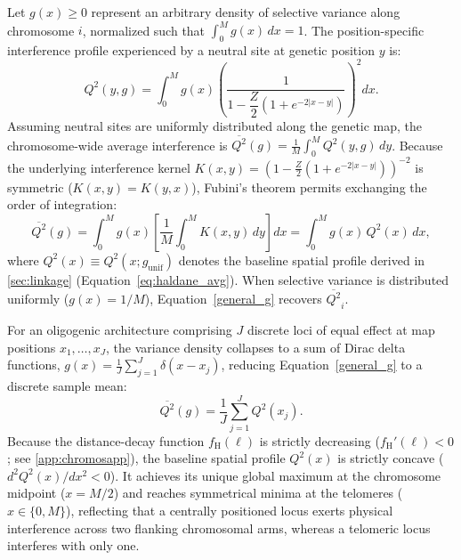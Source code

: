 \documentclass[12pt]{article}
\begin{document}
Let $g(x) \ge 0$ represent an arbitrary density of selective variance along chromosome $i$, normalized such that $\int_0^M g(x)\,dx = 1$. The position-specific interference profile experienced by a neutral site at genetic position $y$ is:
\begin{equation}
    Q^2(y, g) = \int_0^M g(x)\left(\frac{1}{1 - \dfrac{Z}{2}\left(1 + e^{-2|x-y|}\right)}\right)^2 dx.
\end{equation}
Assuming neutral sites are uniformly distributed along the genetic map, the chromosome-wide average interference is $\overline{Q^2}(g) = \frac{1}{M}\int_0^M Q^2(y, g)\,dy$. Because the underlying interference kernel $K(x,y) = \left(1 - \frac{Z}{2}(1 + e^{-2|x-y|})\right)^{-2}$ is symmetric ($K(x,y) = K(y,x)$), Fubini's theorem permits exchanging the order of integration:
\begin{equation}
    \overline{Q^2}(g) = \int_0^M g(x) \left[\frac{1}{M}\int_0^M K(x,y)\,dy\right] dx = \int_0^M g(x)\,Q^2(x)\,dx, \label{general_g}
\end{equation}
where $Q^2(x) \equiv Q^2(x; g_\text{unif})$ denotes the baseline spatial profile derived in \autoref{sec:linkage} (Equation~\eqref{eq:haldane_avg}). When selective variance is distributed uniformly ($g(x) = 1/M$), Equation~\eqref{general_g} recovers $\overline{Q^2}_i$. 

For an oligogenic architecture comprising $J$ discrete loci of equal effect at map positions $x_1, \ldots, x_J$, the variance density collapses to a sum of Dirac delta functions, $g(x) = \frac{1}{J}\sum_{j=1}^J \delta(x - x_j)$, reducing Equation~\eqref{general_g} to a discrete sample mean:
\begin{equation}
    \overline{Q^2}(g) = \frac{1}{J}\sum_{j=1}^J Q^2(x_j). \label{oligogenic_mean}
\end{equation}
Because the distance-decay function $f_\text{H}(\ell)$ is strictly decreasing ($f_\text{H}'(\ell) < 0$; see \autoref{app:chromosapp}), the baseline spatial profile $Q^2(x)$ is strictly concave ($d^2 Q^2(x)/dx^2 < 0$). It achieves its unique global maximum at the chromosome midpoint ($x = M/2$) and reaches symmetrical minima at the telomeres ($x \in \{0, M\}$), reflecting that a centrally positioned locus exerts physical interference across two flanking chromosomal arms, whereas a telomeric locus interferes with only one.
\end{document}
